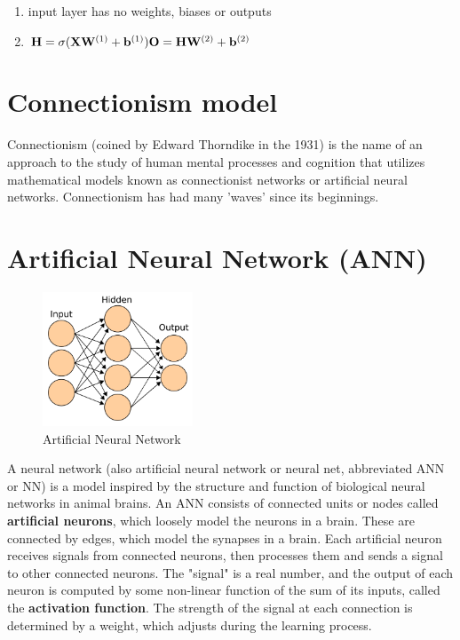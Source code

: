 \begin{enumerate}
    \item input layer has no weights, biases or outputs

    \item $
        \hfill
        \mathbf{H} = \sigma(\mathbf{X} \mathbf{W}^{(1)} + \mathbf{b}^{(1)})
        \hfill
        \mathbf{O} = \mathbf{H}\mathbf{W}^{(2)} + \mathbf{b}^{(2)}
        \hfill
    $

    

\end{enumerate}


\section{Connectionism model \cite{wiki-Connectionism}}\label{Connectionism model}
Connectionism (coined by Edward Thorndike in the 1931) is the name of an approach to the study of human mental processes and cognition that utilizes mathematical models known as connectionist networks or artificial neural networks. Connectionism has had many 'waves' since its beginnings.

\section{Artificial Neural Network (ANN) \cite{wiki-ann}}\label{ann}
\begin{figure}[H]
    \centering
    \includegraphics[height=4cm]{Pictures/deep_neural_networks/ann.png}
    \caption{Artificial Neural Network}
\end{figure}
A neural network (also artificial neural network or neural net, abbreviated ANN or NN) is a model inspired by the structure and function of biological neural networks in animal brains. An ANN consists of connected units or nodes called \textbf{artificial neurons}, which loosely model the neurons in a brain. These are connected by edges, which model the synapses in a brain. Each artificial neuron receives signals from connected neurons, then processes them and sends a signal to other connected neurons. The "signal" is a real number, and the output of each neuron is computed by some non-linear function of the sum of its inputs, called the \textbf{activation function}. The strength of the signal at each connection is determined by a weight, which adjusts during the learning process.

